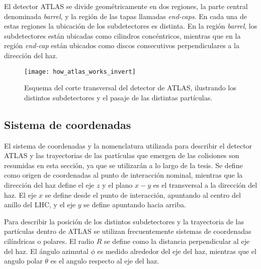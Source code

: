 El detector ATLAS se divide geométricamente en dos regiones, la parte central
denominada \emph{barrel}, y la región de las tapas llamadas \emph{end-caps}.
En cada una de estas regiones la ubicación de los
subdetectores es distinta. En la región \emph{barrel}, los subdetectores están
ubicadas como cilindros concéntricos, mientras que en la región \emph{end-cap}
están ubicados como discos consecutivos perpendiculares a la dirección del haz.


\begin{figure}[!p]
  \centering

  \texttt{[image: how\_atlas\_works\_invert]}

  \caption{Esquema del corte transversal del detector de ATLAS, ilustrando los distintos
  subdetectores y el pasaje de las distintas partículas.}
  \label{fig:how_atlas_works}

\end{figure}


\subsection{Sistema de coordenadas}


El sistema de coordenadas y la nomenclatura utilizada para describir el detector
ATLAS y las trayectorias de las partículas que emergen de las colisiones son
resumidas en esta sección, ya que se utilizarán a lo largo de la tesis. Se
define como origen de coordenadas al punto de interacción nominal, mientras que
la dirección del haz define el eje $z$ y el plano $x-y$ es el transversal a la
dirección del haz. El eje $x$ se define desde el punto de interacción, apuntando
al centro del anillo del LHC, y el eje $y$ se define apuntando hacia arriba.

Para describir la posición de los distintos
subdetectores y la trayectoria de las partículas dentro de ATLAS se utilizan
frecuentemente sistemas de coordenadas cilíndricas o polares. El radio $R$ se
define como la distancia perpendicular al eje del haz. El ángulo azimutal $\phi
$ es medido alrededor del eje del haz, mientras que el angulo polar $\theta$
es el angulo respecto al eje del haz.


